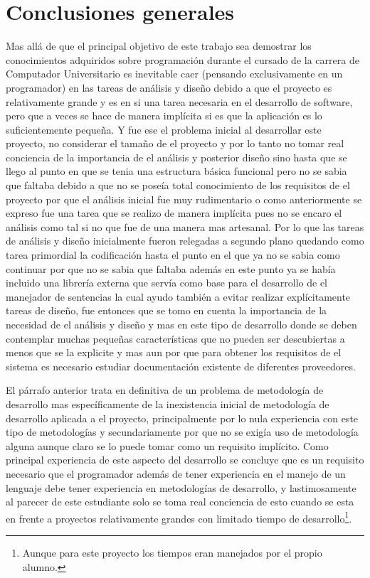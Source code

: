 \section{Conclusiones generales}    
%
Mas allá de que el principal objetivo de este trabajo sea demostrar los conocimientos adquiridos sobre programación durante el cursado de la carrera de Computador Universitario es inevitable caer (pensando exclusivamente en un programador) en las tareas de análisis y diseño debido a que el proyecto es relativamente grande y es en si una tarea necesaria en el desarrollo de software, pero que a veces se hace de manera implícita si es que la aplicación es lo suficientemente pequeña. Y fue ese el problema inicial al desarrollar este proyecto, no considerar el tamaño de el proyecto y por lo tanto no tomar real conciencia de la importancia de el análisis y posterior diseño sino hasta que se llego al punto en que se tenia una estructura básica funcional pero no se sabia que faltaba debido a que no se poseía total conocimiento de los requisitos de el proyecto por que el análisis inicial fue muy rudimentario o como anteriormente se expreso fue una tarea que se realizo de manera implícita pues no se encaro el análisis como tal si no que fue de una manera mas artesanal. Por lo que las tareas de análisis y diseño inicialmente fueron relegadas a segundo plano quedando como tarea primordial la codificación hasta el punto en el que ya no se sabia como continuar por que no se sabia que faltaba además en este punto ya se había incluido una librería externa que servía como base para el desarrollo de el manejador de sentencias la cual ayudo también a evitar realizar explícitamente tareas de diseño, fue entonces que se tomo en cuenta la importancia de la necesidad de el análisis y diseño y mas en este tipo de desarrollo donde se deben contemplar muchas pequeñas características que no pueden ser descubiertas a menos que se la explicite y mas aun por que para obtener los requisitos de el sistema es necesario estudiar documentación existente de diferentes proveedores.

El párrafo anterior trata en definitiva de un problema de metodología de desarrollo mas específicamente de la inexistencia inicial de metodología de desarrollo aplicada a el proyecto, principalmente por lo nula experiencia con este tipo de metodologías y secundariamente por que no se exigía uso de metodología alguna aunque claro se lo puede tomar como un requisito implícito. Como principal experiencia de este aspecto del desarrollo se concluye que es un requisito necesario que el programador además de tener experiencia en el manejo de un lenguaje debe tener experiencia en metodologías de desarrollo, y lastimosamente al parecer de este estudiante solo se toma real conciencia de esto cuando se esta en frente a proyectos relativamente grandes con limitado tiempo de desarrollo\footnote{Aunque para este proyecto los tiempos eran manejados por el propio alumno.}.

